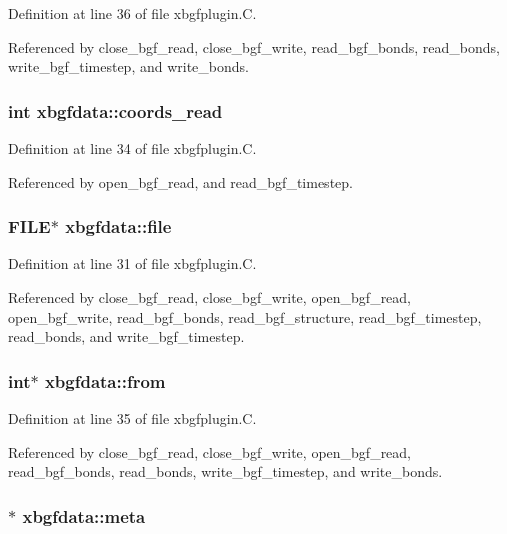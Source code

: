 Definition at line 36 of file xbgfplugin.C.

Referenced by close\_\-bgf\_\-read, close\_\-bgf\_\-write, read\_\-bgf\_\-bonds, read\_\-bonds, write\_\-bgf\_\-timestep, and write\_\-bonds.
\subsubsection{\setlength{\rightskip}{0pt plus 5cm}int xbgfdata::coords\_\-read}\label{structxbgfdata_m6}




Definition at line 34 of file xbgfplugin.C.

Referenced by open\_\-bgf\_\-read, and read\_\-bgf\_\-timestep.
\subsubsection{\setlength{\rightskip}{0pt plus 5cm}FILE$\ast$ xbgfdata::file}\label{structxbgfdata_m0}




Definition at line 31 of file xbgfplugin.C.

Referenced by close\_\-bgf\_\-read, close\_\-bgf\_\-write, open\_\-bgf\_\-read, open\_\-bgf\_\-write, read\_\-bgf\_\-bonds, read\_\-bgf\_\-structure, read\_\-bgf\_\-timestep, read\_\-bonds, and write\_\-bgf\_\-timestep.
\subsubsection{\setlength{\rightskip}{0pt plus 5cm}int$\ast$ xbgfdata::from}\label{structxbgfdata_m7}




Definition at line 35 of file xbgfplugin.C.

Referenced by close\_\-bgf\_\-read, close\_\-bgf\_\-write, open\_\-bgf\_\-read, read\_\-bgf\_\-bonds, read\_\-bonds, write\_\-bgf\_\-timestep, and write\_\-bonds.
\subsubsection{$\ast$ xbgfdata::meta}\label{structxbgfdata_m2}




